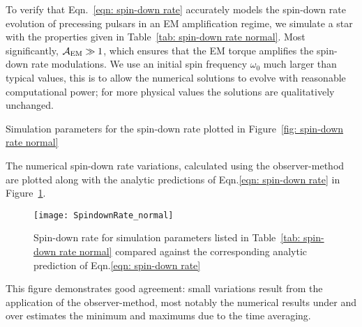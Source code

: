 \documentclass[../full_thesis/full_thesis.tex]{subfiles}
\newcommand{\thisdir}{../inertial_frame}
\begin{document}
To verify that Eqn.~\eqref{eqn: spin-down rate} accurately models the spin-down
rate evolution of precessing pulsars in an EM amplification regime, we simulate
a star with the properties given in Table~\ref{tab: spin-down rate normal}.
Most significantly, $\mathcal{A}_{\mathrm{EM}} \gg 1$, which ensures that the EM torque amplifies
the spin-down rate modulations. We use an initial spin frequency $\omega_0$
much larger than typical values, this is to allow the numerical solutions to
evolve with reasonable computational power; for more physical values the
solutions are qualitatively unchanged.
\begin{table}[htb]
\centering

\caption{Simulation parameters for the spin-down rate plotted in Figure~\ref{fig:
spin-down rate normal}}
\label{tab: spin-down rate normal}
\end{table}

The numerical spin-down rate variations, calculated using the observer-method
are plotted along with the analytic predictions of Eqn.\eqref{eqn: spin-down rate}
in Figure~\ref{fig: spin-down rate normal}.
\begin{figure}[htb]
\centering
\texttt{[image: SpindownRate\_normal]}
\caption{Spin-down rate for simulation parameters listed in Table~\ref{tab:
spin-down rate normal} compared against the corresponding analytic prediction
of Eqn.\eqref{eqn: spin-down rate} }
\label{fig: spin-down rate normal}
\end{figure}
This figure demonstrates good agreement: small variations result from the
application of the observer-method, most notably the numerical results under
and over estimates the minimum and maximums due to the time averaging.
\end{document}
